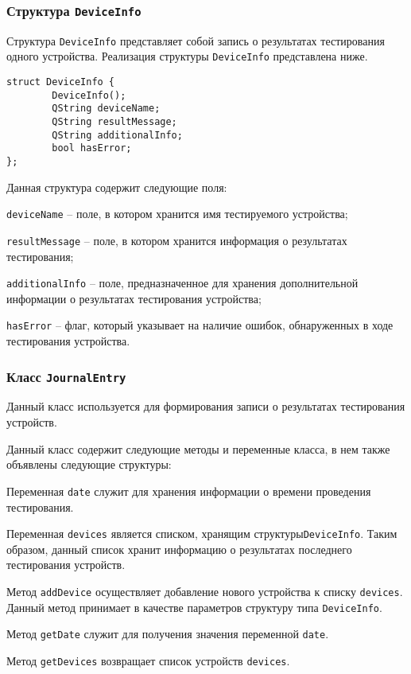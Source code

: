 \subsubsection{Структура \texttt{DeviceInfo}}
Структура \texttt{DeviceInfo} представляет собой запись о результатах тестирования одного устройства.
Реализация структуры \texttt{DeviceInfo} представлена ниже.
\medskip
\begin{verbatim}
struct DeviceInfo {
        DeviceInfo();
        QString deviceName;
        QString resultMessage;
        QString additionalInfo;
        bool hasError;
};
\end{verbatim}
\medskip


Данная структура содержит следующие поля:
\begin{enum}
	\item \texttt{deviceName} -- поле, в котором хранится имя тестируемого устройства;
	\item \texttt{resultMessage} -- поле, в котором хранится информация о результатах тестирования;
	\item \texttt{additionalInfo} -- поле, предназначенное для хранения дополнительной информации о
		результатах тестирования устройства;
	\item \texttt{hasError} -- флаг, который указывает на наличие ошибок, обнаруженных в ходе
		тестирования устройства.
\end{enum}

\subsubsection{Класс \texttt{JournalEntry}}
Данный класс используется для формирования записи о результатах тестирования устройств.

Данный класс содержит следующие методы и переменные класса, в нем также объявлены следующие структуры:
\begin{enum}
	\item Переменная \texttt{date} служит для хранения информации о времени проведения тестирования.

	\item Переменная \texttt{devices} является списком, хранящим структуры\break \texttt{DeviceInfo}. Таким образом,
		данный список хранит информацию о результатах последнего тестирования устройств.

	\item Метод \texttt{addDevice} осуществляет добавление нового устройства к списку \texttt{devices}. Данный метод
		принимает в качестве параметров структуру типа \texttt{DeviceInfo}.

	\item Метод \texttt{getDate} служит для получения значения переменной \texttt{date}.

	\item Метод \texttt{getDevices} возвращает список устройств \texttt{devices}.
\end{enum}

